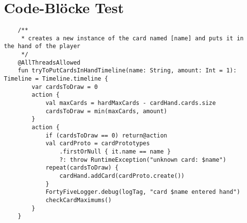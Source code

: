 
\chapter{Code-Blöcke Test}\label{ch:code-blocke-test}

\renewcommand{\kapitelautor}{Autor: Marvin}

\Blindtext

\begin{verbatim}
    /**
     * creates a new instance of the card named [name] and puts it in the hand of the player
     */
    @AllThreadsAllowed
    fun tryToPutCardsInHandTimeline(name: String, amount: Int = 1): Timeline = Timeline.timeline {
        var cardsToDraw = 0
        action {
            val maxCards = hardMaxCards - cardHand.cards.size
            cardsToDraw = min(maxCards, amount)
        }
        action {
            if (cardsToDraw == 0) return@action
            val cardProto = cardPrototypes
                .firstOrNull { it.name == name }
                ?: throw RuntimeException("unknown card: $name")
            repeat(cardsToDraw) {
                cardHand.addCard(cardProto.create())
            }
            FortyFiveLogger.debug(logTag, "card $name entered hand")
            checkCardMaximums()
        }
    }
\end{verbatim}

\Blindtext

\renewcommand{\kapitelautor}{}
